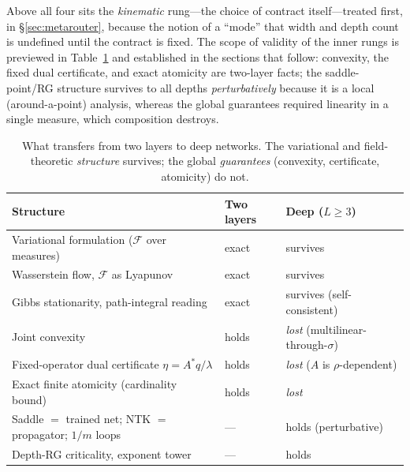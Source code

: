 \documentclass[11pt]{article}
\theoremstyle{definition}
\newcommand{\F}{\mathcal{F}}
\begin{document}
Above all four sits the \emph{kinematic} rung---the choice of contract itself---treated first, in
\S\ref{sec:metarouter}, because the notion of a ``mode'' that width and depth count is undefined until
the contract is fixed. The scope of validity of the inner rungs is previewed in Table~\ref{tab:status} and
established in the sections that follow: convexity, the fixed dual
certificate, and exact atomicity are two-layer facts; the saddle-point/RG structure survives
to all depths \emph{perturbatively} because it is a local (around-a-point) analysis, whereas
the global guarantees required linearity in a single measure, which composition destroys.

\begin{table}[h]
\centering
\small
\begin{tabular}{lll}
\hline
\textbf{Structure} & \textbf{Two layers} & \textbf{Deep ($L\ge3$)}\\
\hline
Variational formulation ($\F$ over measures) & exact & survives\\
Wasserstein flow, $\F$ as Lyapunov & exact & survives\\
Gibbs stationarity, path-integral reading & exact & survives (self-consistent)\\
Joint convexity & holds & \emph{lost} (multilinear-through-$\sigma$)\\
Fixed-operator dual certificate $\eta=A^\ast q/\lambda$ & holds & \emph{lost} ($A$ is $\rho$-dependent)\\
Exact finite atomicity (cardinality bound) & holds & \emph{lost}\\
Saddle $=$ trained net; NTK $=$ propagator; $1/m$ loops & --- & holds (perturbative)\\
Depth-RG criticality, exponent tower & --- & holds\\
\hline
\end{tabular}
\caption{What transfers from two layers to deep networks. The variational and
field-theoretic \emph{structure} survives; the global \emph{guarantees} (convexity,
certificate, atomicity) do not.}
\label{tab:status}
\end{table}
\end{document}

